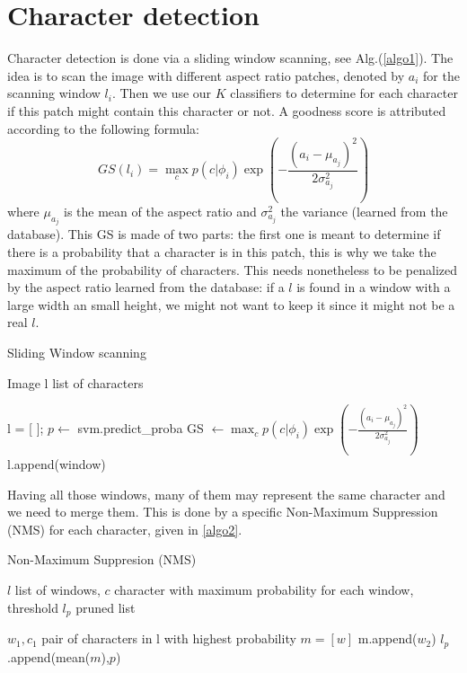 \documentclass[10pt,a4paper]{article}
\begin{document}
\section{Character detection}

Character detection is done via a sliding window scanning, see Alg.(\ref{algo1}). The idea is to scan the image with different aspect ratio patches, denoted by $a_i$ for the scanning window $l_i$. Then we use our $K$ classifiers to determine for each character if this patch might contain this character or not. A goodness score is attributed according to the following formula:
\begin{equation}
GS(l_i) = \max_c p(c|\phi_i) \exp\left( - \frac{(a_i - \mu_{a_j})^2}{2\sigma_{a_j}^2} \right)
\label{eq:}
\end{equation}
where $\mu_{a_j}$ is the mean of the aspect ratio and $\sigma_{a_j}^2$ the variance (learned from the database). This GS is made of two parts: the first one is meant to determine if there is a probability that a character is in this patch, this is why we take the maximum of the probability of characters. This needs nonetheless to be penalized by the aspect ratio learned from the database: if a $l$ is found in a window with a large width an small height, we might not want to keep it since it might not be a real $l$. 

\begin{algorithm}
\caption{Sliding Window scanning}
\label{algo1}
\begin{algorithmic}
\Require Image
\Ensure l list of characters

\State l = [ ]; 
	\State $p \leftarrow$ svm.predict\_proba
	\State GS $\leftarrow \max_c p(c|\phi_i) \exp\left( - \frac{(a_i - \mu_{a_j})^2}{2\sigma_{a_j}^2} \right)$
		\State l.append(window) 
	\EndIf
\EndFor
\end{algorithmic}
\end{algorithm}

Having all those windows, many of them may represent the same character and we need to merge them. This is done by a specific Non-Maximum Suppression (NMS) for each character, given in \ref{algo2}. 
\begin{algorithm}
\caption{Non-Maximum Suppresion (NMS)}
\label{algo2}
\begin{algorithmic}
\Require $l$ list of windows, $c$ character with maximum probability for each window, threshold
\Ensure $l_p$ pruned list

	\State $w_1, c_1$ pair of characters in l with highest probability
	\State $m = [w]$
			m.append($w_2$)
		\EndIf
	\EndFor
	\State $l_p$.append(mean($m$),$p$)
\EndWhile
\end{algorithmic}
\end{algorithm}
\end{document}
